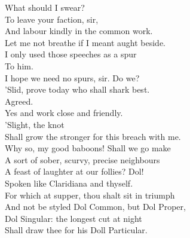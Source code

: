 \documentclass[a4paper,oneside,12pt]{memoir}
\begin{document}
\begin{drama*}
\subtlespeaks What should I swear?\\
\dolspeaks {} To leave your faction, sir,\\
And labour kindly in the common work.\\
\subtlespeaks Let me not breathe if I meant aught beside.\\
I only used those speeches as a spur\\
To him.\\
\dolspeaks {} I hope we need no spurs, sir. Do we?\\
\facespeaks 'Slid, prove today who shall shark best.\\
\subtlespeaks {} Agreed.\\
\dolspeaks Yes and work close and friendly.\\
\subtlespeaks {} 'Slight, the knot\\
Shall grow the stronger for this breach with me.\\
\dolspeaks Why so, my good baboons! Shall we go make\\
A sort of sober, scurvy, precise neighbours\\
A feast of laughter at our follies?
\subtlespeaks {} Dol!\\
Spoken like Claridiana and thyself.\\
\facespeaks For which at supper, thou shalt sit in triumph\\
And not be styled Dol Common, but Dol Proper,\\
Dol Singular: the longest cut at night\\
Shall draw thee for his Doll Particular.\\

\pagebreak
\scene


\end{drama*}
\end{document}
